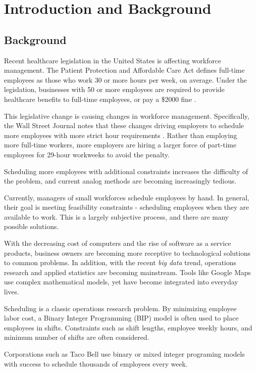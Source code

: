 \chapter{Introduction and Background}

\section{Background}
Recent healthcare legislation in the United States is affecting workforce management. The Patient Protection and Affordable Care Act defines full-time employees as those who work 30 or more hours per week, on average. Under the legislation, businesses with 50 or more employees are required to provide healthcare benefits to full-time employees, or pay a \$2000 fine \cite{ppaca}. 

This legislative change is causing changes in workforce management. Specifically, the Wall Street Journal  notes that these changes driving employers to schedule more employees with more strict hour requirements \cite{wsj}. Rather than employing more full-time workers, more employers are hiring a larger force of part-time employees for 29-hour workweeks to avoid the  penalty. 

Scheduling more employees with additional constraints increases the difficulty of the problem, and current analog methods are becoming increasingly tedious.

Currently, managers of small workforces schedule employees by hand. In general, their goal is meeting feasibility constraints - scheduling employees when they are available to work. This is a largely subjective process, and there are many possible solutions. 

With the decreasing cost of computers and the rise of software as a service products, business owners are becoming more receptive to technological solutions to common problems. In addition, with the recent \emph{big data} trend, operations research and applied statistics are becoming mainstream. Tools like Google Maps use complex mathematical models, yet have become integrated into everyday lives.

Scheduling is a classic operations research problem. By minimizing employee labor cost, a Binary Integer Programming (BIP) model is often used to place employees in shifts. Constraints such as shift lengths, employee weekly hours, and minimum number of shifts are often considered. 

Corporations such as Taco Bell  use binary or mixed integer programing models \cite{taco} with success to schedule thousands of employees every week. 

